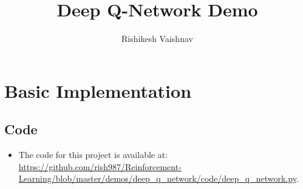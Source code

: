 \documentclass[a4paper]{article}
\title{Deep Q-Network Demo}
\author{Rishikesh Vaishnav}
\begin{document}
\maketitle
\section*{Basic Implementation}
\subsection*{Code}
\begin{itemize}
    \item The code for this project is available at: 
\url{https://github.com/rish987/Reinforcement-Learning/blob/master/demos/deep_q_network/code/deep_q_network.py}.
\end{itemize}
\end{document}
